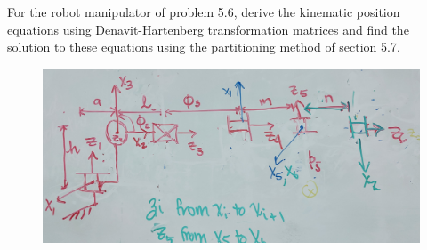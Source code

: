 \documentclass[onecolumn,10pt]{jhwhw}
\begin{document}



\problem{}
For the robot manipulator of problem 5.6, derive the kinematic position equations using Denavit-Hartenberg transformation matrices and find the solution to these equations using the partitioning method of section 5.7.

\begin{figure}[h!]
  \centering
  \includegraphics[width=\linewidth]{homework3-diagramDH.jpg}
\end{figure}
\end{document}
